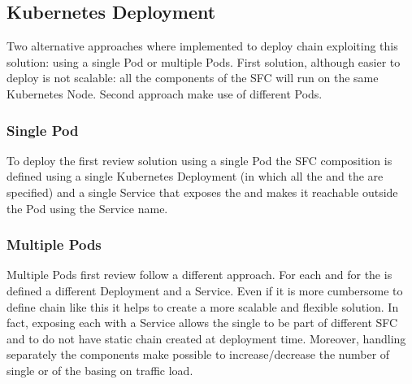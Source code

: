 \subsection{Kubernetes Deployment}
Two alternative approaches where implemented to deploy chain exploiting this
solution: using a single Pod or multiple Pods. First solution, although easier
to deploy is not scalable: all the components of the SFC will run on the same
Kubernetes Node. Second approach make use of different Pods.

\subsubsection*{Single Pod}
To deploy the first review solution using a single Pod the SFC composition is
defined using a single Kubernetes Deployment (in which all the \vnf{} and
the \enchainer{} are specified) and a single Service that exposes the
\enchainer{} and makes it reachable outside the Pod using the Service name.

\subsubsection*{Multiple Pods}
Multiple Pods first review follow a different approach. For each \vnf{}
and for the \enchainer{} is defined a different Deployment and a Service.
Even if it is more cumbersome to define chain like this it helps to create a
more scalable and flexible solution. In fact, exposing each \vnf{} with a
Service allows the single \vnf{} to be part of different SFC and to do not
have static chain created at deployment time. Moreover, handling separately
the components make possible to increase/decrease the number of single
\vnfs{} or of the \enchainer{} basing on traffic load.


